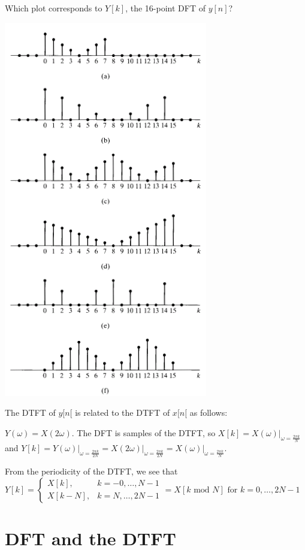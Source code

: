 \documentclass[11pt]{article}
\begin{document}
Which plot corresponds to $Y[k]$, the 16-point DFT of $y[n]$?

\includegraphics[scale=1]{p8-32.png} 

{\color{blue}
The DTFT of $y[n[$ is related to the DTFT of $x[n[$ as follows: 

$Y(\omega) = X(2\omega)$. The DFT is samples of the DTFT, so $X[k] = X(\omega)\big|_{\omega = \frac{2 \pi k}{N}}$ and $Y[k] =Y(\omega)\big|_{\omega = \frac{2 \pi k}{2N}} = X(2\omega) \big|_{\omega = \frac{2 \pi k}{2N}} = X(\omega) \big|_{\omega = \frac{2 \pi k}{N}}$. 

From the periodicity of the DTFT, we see that $Y[k] = \begin{cases}X[k], & k=-0,\ldots, N-1 \\ X[k-N], & k = N, \ldots, 2N-1\end{cases} = X[k \text{ mod } N] \text{ for } k=0,\ldots, 2N-1$
}


\section{DFT and the DTFT}
\end{document}
